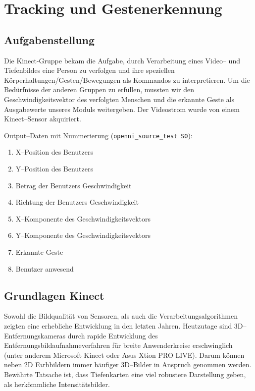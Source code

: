 \chapter{Tracking und Gestenerkennung}

\section{Aufgabenstellung}
\label{kinect_aufgabenstellung_sec}
\authorsection{\editormarton}

Die Kinect-Gruppe bekam die Aufgabe, durch Verarbeitung eines Video-- und
 Tiefenbildes eine Person zu verfolgen und ihre speziellen
 Körperhaltungen/Gesten/Bewegungen als Kommandos zu interpretieren.
 Um die Bedürfnisse der anderen Gruppen zu erfüllen, mussten wir den Geschwindigkeitsvektor des verfolgten Menschen und die
 erkannte Geste als Ausgabewerte unseres Moduls weitergeben. Der Videostrom wurde von einem Kinect--Sensor akquiriert.
\vspace{0.3cm}

\noindent Output--Daten mit Nummerierung (\lstinline{openni_source_test SO}):
\begin{enumerate}[start=0]
  \item X--Position des Benutzers
  \item Y--Position des Benutzers
  \item Betrag der Benutzers Geschwindigkeit
  \item Richtung der Benutzers Geschwindigkeit
  \item X--Komponente des Geschwindigkeitsvektors
  \item Y--Komponente des Geschwindigkeitsvektors
  \item Erkannte Geste
  \item Benutzer anwesend
\end{enumerate}

\section{Grundlagen Kinect}
\label{kinect_grundlagen_sec}
\authorsection{\editormarton}

Sowohl die Bildqualität von Sensoren, als auch die Verarbeitungsalgorithmen zeigten eine erhebliche Entwicklung in den letzten Jahren.
 Heutzutage sind 3D--Entfernungskameras durch rapide Entwicklung des
 Entfernungsbildaufnahmeverfahren für breite Anwenderkreise erschwinglich
 (unter anderem Microsoft Kinect oder Asus Xtion PRO LIVE).
 Darum können neben 2D Farbbildern immer häufiger 3D--Bilder in Anspruch genommen
 werden. Bewährte Tatsache ist, dass Tiefenkarten eine viel robustere Darstellung geben, als herkömmliche Intensitätsbilder.
 
